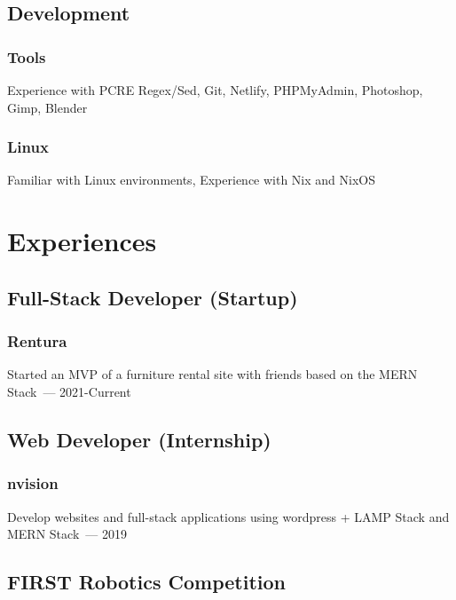 \documentclass{article}
\begin{document}
\subsection{Development}
\subsubsection{Tools}
Experience with PCRE Regex/Sed, Git, Netlify, PHPMyAdmin, Photoshop, Gimp, Blender
\subsubsection{Linux}
Familiar with Linux environments, Experience with Nix and NixOS


\section*{Experiences}

\subsection{Full-Stack Developer (Startup)}
\subsubsection{Rentura}
Started an MVP of a furniture rental site with friends based on the MERN Stack\ --- 2021\--Current


\subsection{Web Developer (Internship)}
\subsubsection{nvision} Develop websites and full-stack applications using wordpress + LAMP Stack and MERN Stack\ --- 2019

\subsection{FIRST Robotics Competition}
\end{document}

